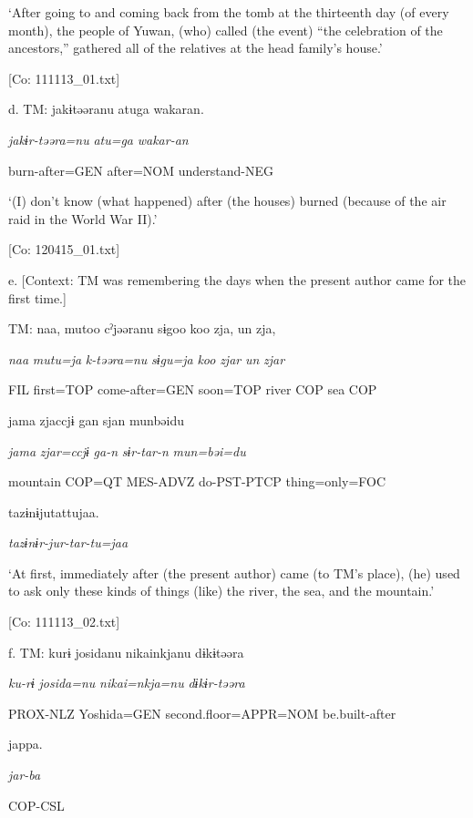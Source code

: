       ‘After going to and coming back from the tomb at the thirteenth day (of every month), the people of Yuwan, (who) called (the event) “the celebration of the ancestors,” gathered all of the relatives at the head family’s house.’

      [Co: 111113\_01.txt]

  d.  TM:  jakɨtəəranu  atuga  wakaran.

      \textit{jakɨr-təəra=nu}  \textit{atu=ga}  \textit{wakar-an}

      burn-after=GEN  after=NOM  understand-NEG

      ‘(I) don’t know (what happened) after (the houses) burned (because of the air raid in the World War II).’

      [Co: 120415\_01.txt]

  e.  [Context: TM was remembering the days when the present author came for the first time.]

    TM:  naa,  mutoo  cˀjəəranu  sɨgoo  koo  zja,  un  zja,

      \textit{naa}  \textit{mutu=ja}  \textit{k-təəra=nu}  \textit{sɨgu=ja}  \textit{koo}  \textit{zjar}  \textit{un}  \textit{zjar}

      FIL  first=TOP  come-after=GEN  soon=TOP  river  COP  sea  COP

      jama  zjaccjɨ  gan  sjan  munbəidu

      \textit{jama}  \textit{zjar=ccjɨ}  \textit{ga-n}  \textit{sɨr-tar-n}  \textit{mun=bəi=du}

      mountain  COP=QT  MES-ADVZ  do-PST-PTCP  thing=only=FOC

      tazɨnɨjutattujaa.

      \textit{tazɨnɨr-jur-tar-tu=jaa}

      ‘At first, immediately after (the present author) came (to TM’s place), (he) used to ask only these kinds of things (like) the river, the sea, and the mountain.’

      [Co: 111113\_02.txt]

  f.  TM:  kurɨ  josidanu  {\textbar}nikai{\textbar}nkjanu  dɨkɨtəəra

      \textit{ku-rɨ}  \textit{josida=nu}  \textit{nikai=nkja=nu}  \textit{dɨkɨr-təəra}

      PROX-NLZ  Yoshida=GEN  second.floor=APPR=NOM  be.built-after

      jappa.

      \textit{jar-ba}

      COP-CSL

